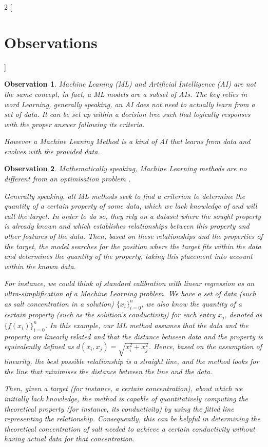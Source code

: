 \documentclass[12pt,letterpaper]{article}
\newtheorem{observation}{Observation}
\begin{document}
\begin{multicols}{2}
[
\section{Observations}
]
\begin{observation}
Machine Leaning (ML) and Artificial Intelligence (AI) are not the same concept, in fact, a ML  models are a subset of AIs. The key relies in word \emph{Learning}, generally speaking, an AI does not need to actually learn from a set of data. It can be set up within a decision tree such that logically responses with the proper answer following its criteria. \par
However a Machine Leaning Method is a kind of AI that \emph{learns} from data and evolves with the provided data.
\end{observation}
\begin{observation}
Mathematically speaking, Machine Learning methods are no different from an optimisation problem \cite{MathematicsForMachineLearningBook}.\par
Generally speaking, all ML methods seek to find a criterion to determine the quantity of a certain property of some data, which we lack knowledge of and will call the \emph{target}. In order to do so, they rely on a dataset where the sought property is already known and which establishes relationships between this property and other features of the data. Then, based on these relationships and the properties of the \emph{target}, the model searches for the position where the \emph{target} fits within the data and determines the quantity of the property, taking this placement into account within the known data.\par
For instance, we could think of standard calibration with linear regression as an ultra-simplification of a Machine Learning problem. We have a set of data (such as salt concentration in a solution) $\{x_i\}_{i=0}^n$, we also know the quantity of a certain property (such as the solution's conductivity) for each entry $x_j$, denoted as $\{f(x_i)\}_{i=0}^n$. In this example, our ML method assumes that the data and the property are linearly related and that the distance between data and the property is equivalently defined as $d(x_i, x_j) = \sqrt{x_i^2 + x_j^2}$. Hence, based on the assumption of linearity, the best possible relationship is a straight line, and the method looks for the line that minimises the distance between the line and the data.\par
Then, given a \emph{target} (for instance, a certain concentration), about which we initially lack knowledge, the method is capable of quantitatively computing the theoretical property (for instance, its conductivity) by using the fitted line representing the relationship. Consequently, this can be helpful in determining the theoretical concentration of salt needed to achieve a certain conductivity without having actual data for that concentration.\par

\end{observation}
\end{multicols}
\end{document}
